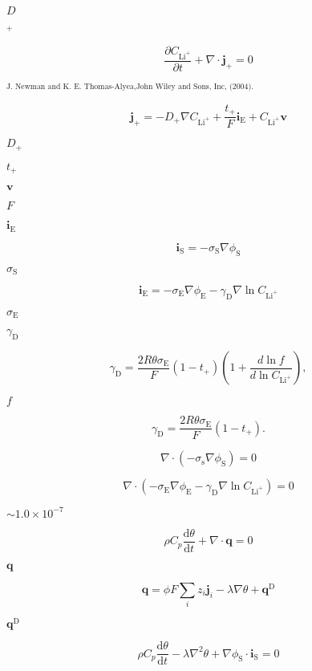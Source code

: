 \documentclass{article}
\begin{document}
$D$
\pagebreak

$^+$
\pagebreak

\[ \frac{\partial C_{\text{Li}^+}}{\partial t}+\nabla\cdot\boldsymbol{j}_+=0 \]
\pagebreak

$^{\text{J. Newman and K. E. Thomas-Alyea,John Wiley and Sons, Inc, (2004).}}$
\pagebreak

\[ \boldsymbol{j}_+=-D_{+}\nabla C_{\text{Li}^+} +\frac{t_+}{F}\boldsymbol{i}_\text{E}+C_{\text{Li}^+}\boldsymbol{v} \]
\pagebreak

$D_{+}$
\pagebreak

$t_+$
\pagebreak

$\boldsymbol{v}$
\pagebreak

$F$
\pagebreak

$\boldsymbol{i}_\text{E}$
\pagebreak

\[ \boldsymbol{i}_\text{S}=-\sigma_\text{S} \nabla\phi_\text{S} \]
\pagebreak

$\sigma_\text{S}$
\pagebreak

\[ \boldsymbol{i}_\text{E}=-\sigma_\text{E}\nabla\phi_\text{E}-\gamma_\text{D}\nabla\ln C_{\text{Li}^+} \]
\pagebreak

$\sigma_\text{E}$
\pagebreak

$\gamma_\text{D}$
\pagebreak

\[ \gamma_\text{D}=\frac{2R\theta \sigma_\text{E}}{F}\left(1-t_+\right)\left(1+\frac{d \ln f}{d\ln C_{\text{Li}^+}}\right), \]
\pagebreak

$f$
\pagebreak

\[ \gamma_\text{D}=\frac{2 R\theta \sigma_\text{E}}{F}\left(1-t_+\right). \]
\pagebreak

\[ \nabla\cdot (- \sigma_\text{s}\nabla\phi_\text{S})=0 \]
\pagebreak

\[ \nabla\cdot\left(-\sigma_\text{E}\nabla\phi_\text{E}-\gamma_\text{D}\nabla\ln C_{\text{Li}^+}\right)=0 \]
\pagebreak

$\sim 1.0\times 10^{-7}$
\pagebreak

\[ \rho C_p\frac{\text{d}\theta}{\text{d}t}+\nabla \cdot\boldsymbol{q}=0 \]
\pagebreak

$\boldsymbol{q}$
\pagebreak

\[ \boldsymbol{q}=\phi F\sum_i z_i\boldsymbol{j}_i-\lambda\nabla\theta+\boldsymbol{q}^\text{D} \]
\pagebreak

$\boldsymbol{q}^\text{D}$
\pagebreak

\[ \rho C_p\frac{\text{d}\theta}{\text{d}t}-\lambda \nabla^2\theta+\nabla\phi_\text{S}\cdot\boldsymbol{i}_\text{S}=0 \]
\pagebreak
\end{document}
